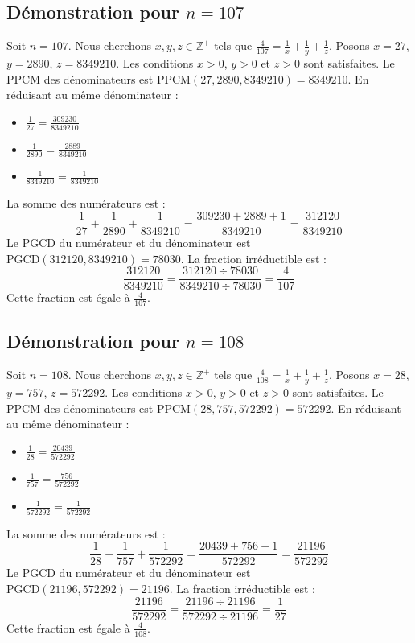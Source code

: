 \documentclass[11pt,a4paper]{article}
\begin{document}
\subsection{Démonstration pour $n = 107$}
Soit $n = 107$. Nous cherchons $x, y, z \in \mathbb{Z}^{+}$ tels que $\frac{4}{107} = \frac{1}{x} + \frac{1}{y} + \frac{1}{z}$.
Posons $x = 27$, $y = 2890$, $z = 8349210$.
Les conditions $x > 0$, $y > 0$ et $z > 0$ sont satisfaites.
Le PPCM des dénominateurs est $\text{PPCM}(27, 2890, 8349210) = 8349210$.
En réduisant au même dénominateur :
\begin{itemize}
    \item $\frac{1}{27} = \frac{309230}{8349210}$
    \item $\frac{1}{2890} = \frac{2889}{8349210}$
    \item $\frac{1}{8349210} = \frac{1}{8349210}$
\end{itemize}
La somme des numérateurs est :
$$ \frac{1}{27} + \frac{1}{2890} + \frac{1}{8349210} = \frac{309230 + 2889 + 1}{8349210} = \frac{312120}{8349210} $$
Le PGCD du numérateur et du dénominateur est $\text{PGCD}(312120, 8349210) = 78030$.
La fraction irréductible est :
$$ \frac{312120}{8349210} = \frac{312120 \div 78030}{8349210 \div 78030} = \frac{4}{107} $$
Cette fraction est égale à $\frac{4}{107}$.

\subsection{Démonstration pour $n = 108$}
Soit $n = 108$. Nous cherchons $x, y, z \in \mathbb{Z}^{+}$ tels que $\frac{4}{108} = \frac{1}{x} + \frac{1}{y} + \frac{1}{z}$.
Posons $x = 28$, $y = 757$, $z = 572292$.
Les conditions $x > 0$, $y > 0$ et $z > 0$ sont satisfaites.
Le PPCM des dénominateurs est $\text{PPCM}(28, 757, 572292) = 572292$.
En réduisant au même dénominateur :
\begin{itemize}
    \item $\frac{1}{28} = \frac{20439}{572292}$
    \item $\frac{1}{757} = \frac{756}{572292}$
    \item $\frac{1}{572292} = \frac{1}{572292}$
\end{itemize}
La somme des numérateurs est :
$$ \frac{1}{28} + \frac{1}{757} + \frac{1}{572292} = \frac{20439 + 756 + 1}{572292} = \frac{21196}{572292} $$
Le PGCD du numérateur et du dénominateur est $\text{PGCD}(21196, 572292) = 21196$.
La fraction irréductible est :
$$ \frac{21196}{572292} = \frac{21196 \div 21196}{572292 \div 21196} = \frac{1}{27} $$
Cette fraction est égale à $\frac{4}{108}$.
\end{document}
